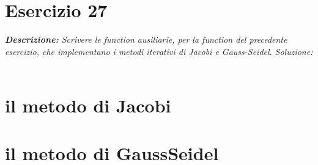 \section{Esercizio 27}
\textit{\textbf{Descrizione:}  Scrivere le function ausiliarie, per la function del precedente esercizio, che implementano i metodi iterativi di Jacobi e Gauss-Seidel.}\newline
\emph{Soluzione: }\\~\\
\section{il metodo di Jacobi}

\section{il metodo di GaussSeidel}
\newpage